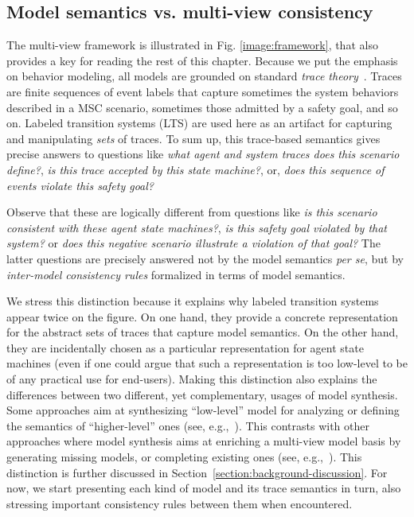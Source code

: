 \subsection{Model semantics vs. multi-view consistency}

The multi-view framework is illustrated in Fig. \ref{image:framework}, that also provides a key for reading the rest of this chapter. Because we put the emphasis on behavior modeling, all models are grounded on standard \emph{trace theory}~\cite{Hoare:1985}. Traces are finite sequences of event labels that capture sometimes the system behaviors described in a MSC scenario, sometimes those admitted by a safety goal, and so on. Labeled transition systems (LTS) are used here as an artifact for capturing and manipulating \emph{sets} of traces. To sum up, this trace-based semantics gives precise answers to questions like \emph{what agent and system traces does this scenario define?}, \emph{is this trace accepted by this state machine?}, or, \emph{does this sequence of events violate this safety goal?}

Observe that these are logically different from questions like \emph{is this scenario consistent with these agent state machines?}, \emph{is this safety goal violated by that system?} or \emph{does this negative scenario illustrate a violation of that goal?} The latter questions are precisely answered not by the model semantics \emph{per se}, but by \emph{inter-model consistency rules} formalized in terms of model semantics. 

We stress this distinction because it explains why labeled transition systems appear twice on the figure. On one hand, they provide a concrete representation for the abstract sets of traces that capture model semantics. On the other hand, they are incidentally chosen as a particular representation for agent state machines (even if one could argue that such a representation is too low-level to be of any practical use for end-users). Making this distinction also explains the differences between two different, yet complementary, usages of model synthesis. Some approaches aim at synthesizing ``low-level'' model for analyzing or defining the semantics of ``higher-level'' ones (see, e.g.,~\cite{Magee:1997, Uchitel:2003, Damas:2009}). This contrasts with other approaches where model synthesis aims at enriching a multi-view model basis by generating missing models, or completing existing ones (see, e.g.,~\cite{VanLamsweerde:1998, Whittle:2000, Uchitel:2004, Damas:2005}). This distinction is further discussed in Section~\ref{section:background-discussion}. For now, we start presenting each kind of model and its trace semantics in turn, also stressing important consistency rules between them when encountered.

